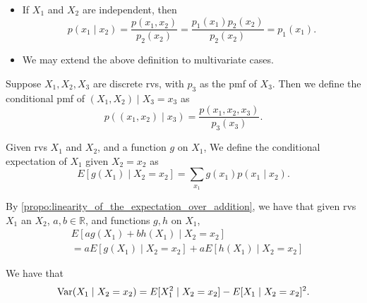 \documentclass[notoc,notitlepage]{tufte-book}
\begin{document}
\begin{note}
  \begin{itemize}
    \item If $X_1$ and $X_2$ are independent, then
      \begin{equation*}
        p(x_1 \mid x_2) = \frac{p(x_1, x_2)}{p_2(x_2)} = \frac{p_1(x_1)
        p_2(x_2)}{p_2(x_2)} = p_1(x_1).
      \end{equation*}
    \item We may extend the above definition to multivariate cases.
  \end{itemize}
\end{note}

\begin{eg}
  Suppose $X_1, X_2, X_3$ are discrete rvs, with $p_3$ as the pmf of $X_3$. Then
  we define the conditional pmf of $(X_1, X_2) \mid X_3 = x_3$ as
  \begin{equation*}
    p((x_1, x_2) \mid x_3) = \frac{p(x_1, x_2, x_3)}{p_3(x_3)}.
  \end{equation*}
\end{eg}

\begin{defn}\label{defn:conditional_expectation_for_discrete_rvs}
  Given rvs $X_1$ and $X_2$, and a function $g$ on $X_1$, We define the
  conditional expectation of $X_1$ given $X_2 = x_2$ as
  \begin{equation*}
    E[g(X_1) \mid X_2 = x_2] = \sum_{x_1} g(x_1) p(x_1 \mid x_2).
  \end{equation*}
\end{defn}

\begin{note}
  By \cref{propo:linearity_of_the_expectation_over_addition}, we have that given
  rvs $X_1$ an $X_2$, $a, b \in \mathbb{R}$, and functions $g, h$ on $X_1$,
  \begin{align*}
    &E \left[ ag(X_1) + bh(X_1) \mid X_2 = x_2 \right] \\
    &= aE[g(X_1) \mid X_2 = x_2] + aE[h(X_1) \mid X_2 = x_2]
  \end{align*}
\end{note}

\begin{propo}\label{propo:conditional_variance_of_discrete_rvs}
  We have that
  \begin{equation*}
    \operatorname{Var}(X_1 \mid X_2 = x_2) = E[X_1^2 \mid X_2 = x_2] - E[X_1 \mid X_2 =
    x_2]^2.
  \end{equation*}
\end{propo}
\end{document}
